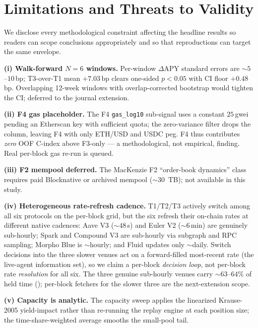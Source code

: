 
\section{Limitations and Threats to Validity}
\label{sec:limitations}

We disclose every methodological constraint affecting the headline
results so readers can scope conclusions appropriately and so that
reproductions can target the same envelope.

\textbf{(i) Walk-forward $N = 6$ windows.}  Per-window
$\Delta$APY standard errors are $\sim 5$--$10$\,bp; T3-over-T1 mean
$+7.03$\,bp clears one-sided $p<0.05$ with CI floor $+0.48$\,bp.
Overlapping 12-week windows with overlap-corrected bootstrap would
tighten the CI; deferred to the journal extension.

\textbf{(ii) F4 gas placeholder.}  The F4 \texttt{gas\_log10}
sub-signal uses a constant $25$\,gwei pending an Etherscan key
with sufficient quota; the zero-variance filter drops the column,
leaving F4 with only ETH/USD and USDC peg. F4 thus contributes
\emph{zero} OOF C-index above F3-only --- a methodological, not
empirical, finding. Real per-block gas re-run is queued.

\textbf{(iii) F2 mempool deferred.}  The MacKenzie F2
``order-book dynamics'' class requires paid Blocknative or
archived mempool ($\sim 30$~TB); not available in this study.

\textbf{(iv) Heterogeneous rate-refresh cadence.}  T1/T2/T3 actively
switch among all six protocols on the per-block grid, but the six
refresh their on-chain rates at different native cadences: Aave V3
($\sim 48$\,s) and Euler V2 ($\sim 6$\,min) are genuinely
sub-hourly; Spark and Compound V3 are sub-hourly via subgraph and
RPC sampling; Morpho Blue is $\sim$hourly; and Fluid updates only
$\sim$daily.  Switch decisions into the three slower venues act on a
forward-filled most-recent rate (the live-agent information set), so
we claim a per-block \emph{decision loop}, not per-block rate
\emph{resolution} for all six.  The three genuine sub-hourly venues
carry $\sim 63$--$64\%$ of held time ();
per-block fetchers for the slower three are the next-extension scope.

\textbf{(v) Capacity is analytic.}  The capacity sweep applies the
linearized Krause-2005 yield-impact rather than re-running the
replay engine at each position size; the time-share-weighted
average smooths the small-pool tail.


